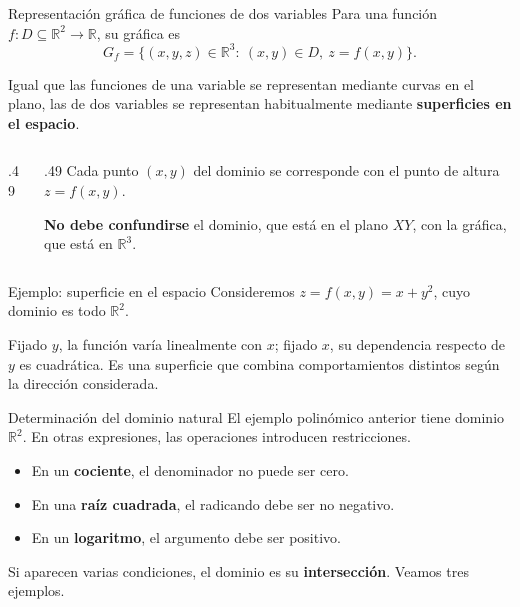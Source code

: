 \documentclass[main.tex]{subfiles}
\begin{document}
\begin{frame}{Representación gráfica de funciones de dos variables}
Para una función $f:D\subseteq\mathbb R^2\to\mathbb R$, su gráfica es
\[
G_f=\{(x,y,z)\in\mathbb R^3:\ (x,y)\in D,\ z=f(x,y)\}.
\]
\smallskip

Igual que las funciones de una variable se representan mediante curvas en el plano, las de dos variables se representan habitualmente mediante \textbf{superficies en el espacio}.
\vspace{-2mm}
\begin{columns}[c]
\begin{column}{.49\textwidth}
\end{column}
\begin{column}{.49\textwidth}
\small Cada punto $(x,y)$ del dominio se corresponde con el punto de altura $z=f(x,y)$.
\medskip

\textbf{No debe confundirse} el dominio, que está en el plano $XY$, con la gráfica, que está en $\mathbb R^3$.
\end{column}
\end{columns}
\end{frame}
\begin{frame}{Ejemplo: superficie en el espacio}
Consideremos $z=f(x,y)=x+y^2$, cuyo dominio es todo $\mathbb R^2$.
\medskip

Fijado $y$, la función varía linealmente con $x$; fijado $x$, su dependencia respecto de $y$ es cuadrática.
\vspace{-2mm}
\vspace{-3mm}
\small Es una superficie que combina comportamientos distintos según la dirección considerada.
\end{frame}
\begin{frame}{Determinación del dominio natural}
El ejemplo polinómico anterior tiene dominio $\mathbb R^2$.
En otras expresiones, las operaciones introducen restricciones.
\medskip
\begin{itemize}
\item En un \textbf{cociente}, el denominador no puede ser cero.
\item En una \textbf{raíz cuadrada}, el radicando debe ser no negativo.
\item En un \textbf{logaritmo}, el argumento debe ser positivo.
\end{itemize}
\medskip

Si aparecen varias condiciones, el dominio es su
\textbf{intersección}. Veamos tres ejemplos.
\end{frame}
\end{document}

